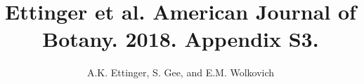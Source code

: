 \documentclass{article}
\begin{document}

\title{Ettinger et al. American Journal of Botany. 2018. Appendix S3.} 
\author{A.K. Ettinger, S. Gee, and E.M. Wolkovich}
\maketitle  %
\renewcommand{\thetable}{Appendix S\arabic{table}}
\setcounter{table}{2}





%
\end{document}
